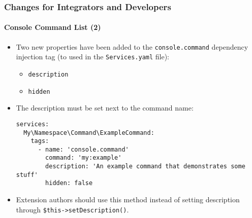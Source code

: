 %

\begin{frame}[fragile]
	\frametitle{Changes for Integrators and Developers}
	\framesubtitle{Console Command List (2)}


	\begin{itemize}
		\item Two new properties have been added to the \texttt{console.command}
			dependency injection tag (to used in the \texttt{Services.yaml} file):
			\begin{itemize}
				\item \texttt{description}
				\item \texttt{hidden}
			\end{itemize}
			\vspace{0.2cm}
		\item The description must be set next to the command name:
\begin{lstlisting}
services:
  My\Namespace\Command\ExampleCommand:
    tags:
      - name: 'console.command'
        command: 'my:example'
        description: 'An example command that demonstrates some stuff'
        hidden: false
\end{lstlisting}

		\item Extension authors should use this method instead of setting
			description through \texttt{\$this->setDescription()}.

	\end{itemize}

\end{frame}

